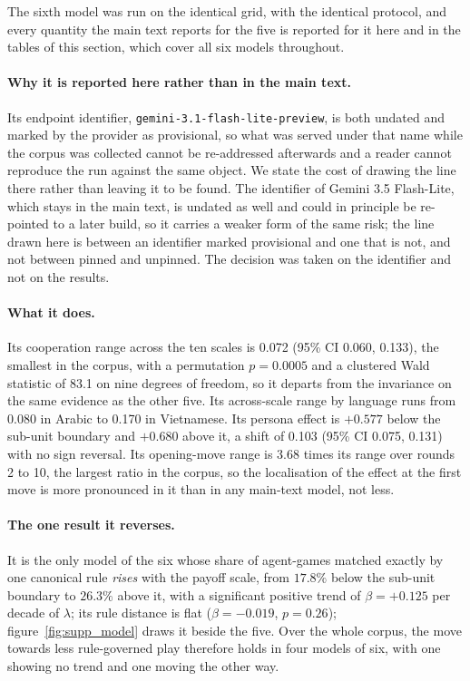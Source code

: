 \documentclass[11pt,a4paper]{article}
\newcommand{\lam}{\lambda}
\newcommand{\ci}[2]{(95\% CI #1, #2)}
\begin{document}
The sixth model was run on the identical grid, with the identical protocol, and every quantity the main text reports for the five is reported for it here and in the tables of this section, which cover all six models throughout.

\paragraph{Why it is reported here rather than in the main text.} Its endpoint
identifier, \texttt{gemini-3.1-\allowbreak flash-lite-\allowbreak preview}, is both undated and marked by the provider as provisional, so what was served under that name while the corpus was collected cannot be re-addressed afterwards and a reader cannot reproduce the run against the same object. We state the cost of drawing the line there rather than leaving it to be found. The identifier of Gemini 3.5 Flash-Lite, which stays in the main text, is undated as well and could in principle be re-pointed to a later build, so it carries a weaker form of the same risk; the line drawn here is between an identifier marked provisional and one that is not, and not between pinned and unpinned. The decision was taken on the identifier and not on the results.

\paragraph{What it does.} Its cooperation range across the ten scales is 0.072
\ci{0.060}{0.133}, the smallest in the corpus, with a permutation $p = 0.0005$ and a clustered Wald statistic of 83.1 on nine degrees of freedom, so it departs from the invariance on the same evidence as the other five. Its across-scale range by language runs from 0.080 in Arabic to 0.170 in Vietnamese. Its persona effect is $+0.577$ below the sub-unit boundary and $+0.680$ above it, a shift of 0.103 \ci{0.075}{0.131} with no sign reversal. Its opening-move range is 3.68 times its range over rounds 2 to 10, the largest ratio in the corpus, so the localisation of the effect at the first move is more pronounced in it than in any main-text model, not less.

\paragraph{The one result it reverses.} It is the only model of the six whose
share of agent-games matched exactly by one canonical rule \emph{rises} with the payoff scale, from $17.8\%$ below the sub-unit boundary to $26.3\%$ above it, with a significant positive trend of $\beta = +0.125$ per decade of $\lam$; its rule distance is flat ($\beta = -0.019$, $p = 0.26$); figure~\ref{fig:supp_model} draws it beside the five. Over the whole corpus, the move towards less rule-governed play therefore holds in four models of six, with one showing no trend and one moving the other way.
\end{document}
